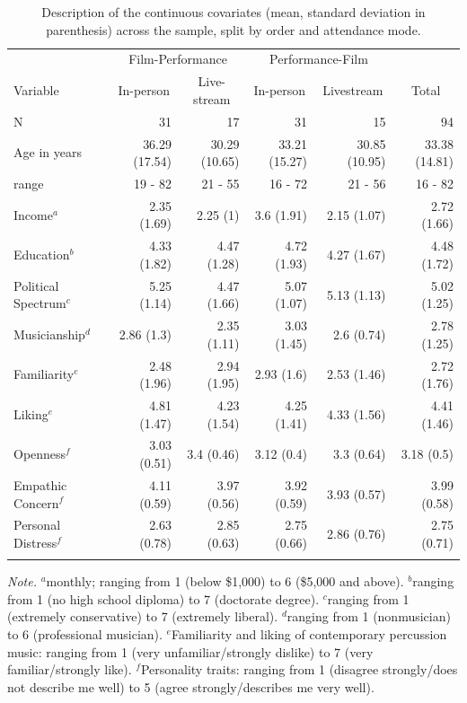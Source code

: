 \documentclass[
  man,floatsintext]{apa6}
\begin{document}
\begin{table}[tbp]

\begin{center}
\begin{threeparttable}

\caption{\label{tab:cont-sample-description}Description of the continuous covariates (mean, standard deviation in parenthesis) across the sample, split by order and attendance mode.}

\begin{tabular}{lrrrrr}
\toprule
 & \multicolumn{2}{c}{Film-Performance} & \multicolumn{2}{c}{Performance-Film}  &\\
\cmidrule(r){2-3} \cmidrule(r){4-5}
Variable & \multicolumn{1}{c}{In-person} & \multicolumn{1}{c}{Live-stream} & \multicolumn{1}{c}{In-person} & \multicolumn{1}{c}{Livestream} & \multicolumn{1}{c}{Total}\\
\midrule
N & 31 & 17 & 31 & 15 & 94\\
Age in years & 36.29 (17.54) & 30.29 (10.65) & 33.21 (15.27) & 30.85 (10.95) & 33.38 (14.81)\\
range & 19 - 82 & 21 - 55 & 16 - 72 & 21 - 56 & 16 - 82\\
Income$^a$ & 2.35 (1.69) & 2.25 (1) & 3.6 (1.91) & 2.15 (1.07) & 2.72 (1.66)\\
Education$^b$ & 4.33 (1.82) & 4.47 (1.28) & 4.72 (1.93) & 4.27 (1.67) & 4.48 (1.72)\\
Political Spectrum$^c$ & 5.25 (1.14) & 4.47 (1.66) & 5.07 (1.07) & 5.13 (1.13) & 5.02 (1.25)\\
Musicianship$^d$ & 2.86 (1.3) & 2.35 (1.11) & 3.03 (1.45) & 2.6 (0.74) & 2.78 (1.25)\\
Familiarity$^e$ & 2.48 (1.96) & 2.94 (1.95) & 2.93 (1.6) & 2.53 (1.46) & 2.72 (1.76)\\
Liking$^e$ & 4.81 (1.47) & 4.23 (1.54) & 4.25 (1.41) & 4.33 (1.56) & 4.41 (1.46)\\
Openness$^f$ & 3.03 (0.51) & 3.4 (0.46) & 3.12 (0.4) & 3.3 (0.64) & 3.18 (0.5)\\
Empathic Concern$^f$ & 4.11 (0.59) & 3.97 (0.56) & 3.92 (0.59) & 3.93 (0.57) & 3.99 (0.58)\\
Personal Distress$^f$ & 2.63 (0.78) & 2.85 (0.63) & 2.75 (0.66) & 2.86 (0.76) & 2.75 (0.71)\\
\bottomrule
\addlinespace
\end{tabular}

\begin{tablenotes}[para]
\normalsize{\textit{Note.} $^a$monthly; ranging from 1 (below \$1,000) to 6 (\$5,000 and above). $^b$ranging from 1 (no high school diploma) to 7 (doctorate degree). $^c$ranging from 1 (extremely conservative) to 7 (extremely liberal). $^d$ranging from 1 (nonmusician) to 6 (professional musician). $^e$Familiarity and liking of contemporary percussion music: ranging from 1 (very unfamiliar/strongly dislike) to 7 (very familiar/strongly like). $^f$Personality traits: ranging from 1 (disagree strongly/does not describe me well) to 5 (agree strongly/describes me very well).}
\end{tablenotes}


\end{threeparttable}
\end{center}
\end{table}
\end{document}
